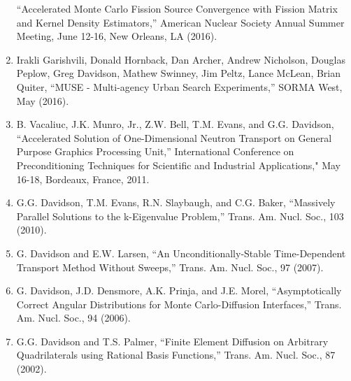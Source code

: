 \documentclass[letterpaper,11pt]{article}
\begin{document}
\begin{enumerate}
    ``Accelerated Monte Carlo Fission Source Convergence with Fission
    Matrix and Kernel Density Estimators,'' American Nuclear Society
    Annual Summer Meeting, June 12-16, New Orleans, LA (2016).
  \item Irakli Garishvili, Donald Hornback, Dan Archer, Andrew
    Nicholson, Douglas Peplow, Greg Davidson, Mathew Swinney, Jim
    Peltz, Lance McLean, Brian Quiter, ``MUSE - Multi-agency Urban
    Search Experiments,'' SORMA West, May (2016).
  \item B. Vacaliuc, J.K. Munro, Jr., Z.W. Bell, T.M. Evans, and
    G.G. Davidson, ``Accelerated Solution of One-Dimensional Neutron
    Transport on General Purpose Graphics Processing Unit,''
    International Conference on Preconditioning Techniques for
    Scientific and Industrial Applications," May 16-18, Bordeaux,
    France, 2011.
  \item G.G. Davidson, T.M. Evans, R.N. Slaybaugh, and C.G. Baker,
    ``Massively Parallel Solutions to the k-Eigenvalue Problem,''
    Trans. Am. Nucl. Soc., 103 (2010).
  \item G. Davidson and E.W. Larsen, ``An Unconditionally-Stable
    Time-Dependent Transport Method Without Sweeps,''
    Trans. Am. Nucl. Soc., 97 (2007).
  \item G. Davidson, J.D. Densmore, A.K. Prinja, and J.E. Morel,
    ``Asymptotically Correct Angular Distributions for Monte
    Carlo-Diffusion Interfaces,'' Trans. Am. Nucl. Soc., 94 (2006).
  \item G.G. Davidson and T.S. Palmer, ``Finite Element Diffusion on
    Arbitrary Quadrilaterals using Rational Basis Functions,''
    Trans. Am. Nucl. Soc., 87 (2002).
\end{enumerate}

\end{document}
